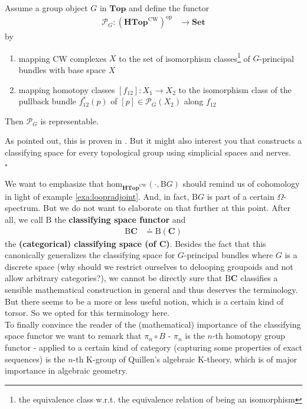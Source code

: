 \begin{thm}
\label{thm:repofbundlefunc}
Assume a group object $G$ in $\mathbf{Top}$ and define the functor
\begin{align*}
  \mathcal{P}_{G}
  \colon
  \left(
    \mathbf{HTop}^{\textrm{CW}}
  \right)^{\mathrm{op}}
  &\rightarrow
  \mathbf{Set}
\end{align*}
by
\begin{enumerate}
\item[$\bullet$]
mapping CW complexes $X$ to the set of isomorphism classes\footnote{the equivalence class w.r.t. the equivalence relation of being an isomorphism} of $G$-principal bundles with base space $X$
\item[$\bullet$]
mapping homotopy classes $[f_{12}] \colon X_{1} \rightarrow X_{2}$ to the isomorphism class of the pullback bundle $f_{12}^{\ast}(p)$ of $[p] \in \mathcal{P}_{G}(X_{2})$ along $f_{12}$
\end{enumerate}
Then $\mathcal{P}_{G}$ is representable.
\end{thm}
\begin{prf}
As pointed out, this is proven in \cite{4dc38f27}.
But it might also interest you that \cite{6d9ad807} constructs a classifying space for every topological group using simplicial spaces and nerves.
\\
\phantom{proven}
\hfill
$\square$
\end{prf}
We want to emphasize that $\mathrm{hom}_{\mathbf{HTop}^{\textrm{CW}}}(\cdot,\mathrm{B}G)$ should remind us of cohomology in light of example \ref{exa:loopradjoint}.
And, in fact, $\mathrm{B}G$ is part of a certain $\Omega$-spectrum.
But we do not want to elaborate on that further at this point.
After all, we call $\mathrm{B}$ the \textbf{classifying space functor} and
\begin{align*}
  \mathrm{B}
  \mathbf{C}
  &\doteq
  \mathrm{B}(\mathbf{C})
\end{align*}
the \textbf{(categorical) classifying space (of $\mathbf{C}$)}.
Besides the fact that this canonically generalizes the classifying space for $G$-principal bundles where $G$ is a discrete space (why should we restrict ourselves to delooping groupoids and not allow arbitrary categories?), we cannot be directly sure that $\mathrm{B}\mathbf{C}$ classifies a sensible mathematical construction in general and thus deserves the terminology.
But there seems to be a more or less useful notion, which is a certain kind of torsor.
So we opted for this terminology here.
\\
To finally convince the reader of the (mathematical) importance of the classifying space functor we want to remark that $\pi_{n} \circ B$ - $\pi_{n}$ is the $n$-th homotopy group functor - applied to a certain kind of category (capturing some properties of exact sequences) is the $n$-th K-group of Quillen's algebraic K-theory, which is of major importance in algebraic geometry.

